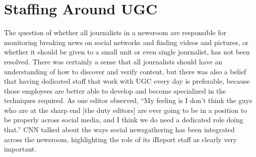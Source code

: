 \documentclass[symmetric, notoc, nobib]{towcenter-book}
\begin{document}
\section{Staffing Around UGC}
The question of whether all journalists in a newsroom are responsible for
monitoring breaking news on social networks and finding videos and pictures,
or whether it should be given to a small unit or even single journalist,
has not been resolved.
There was certainly a sense that all journalists should have an understanding
of how to discover and verify content, but there was also a belief that
having dedicated staff that work with UGC every day is preferable, because
those employees are better able to develop and become specialized in the
techniques required.
As one editor observed, ``My feeling is I don't think the guys who are at the
sharp end [the duty editors] are ever going to be in a position to be properly
across social media, and I think we do need a dedicated role doing that.''
CNN talked about the ways social newsgathering has been integrated
across the newsroom, highlighting the role of its iReport staff as clearly
very important.
\end{document}
